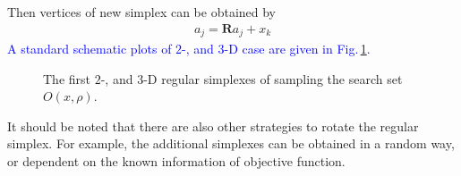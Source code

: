 \documentclass[final,1p,times]{elsarticle}
\begin{document}
Then vertices of new simplex can be obtained by
\begin{align}
	a_j = \bm{R}a_j + x_k
	\label{}
\end{align}
\textcolor{blue}{
A standard schematic plots of $2$-, and
$3$-D case are given in Fig.\,\ref{fig:obset:sketch}.
}
\begin{figure}[!htbp]
	\centering
	\caption{The first $2$-, and $3$-D
	regular simplexes of sampling the search set $O(x, \rho)$.}
\label{fig:obset:sketch}
\end{figure}
It should be noted that there are also other strategies to rotate
the regular simplex. For example, the additional simplexes can be
obtained in a random way, or dependent on the known information
of objective function. 
\end{document}
